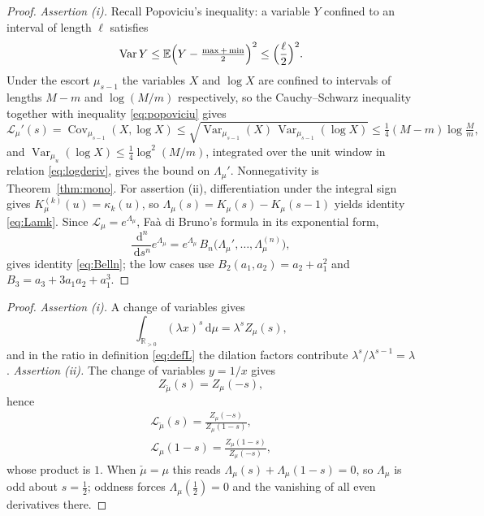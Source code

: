 \documentclass[sn-mathphys-num]{sn-jnl}
\theoremstyle{thmstyleone}%
\theoremstyle{thmstyletwo}%
\theoremstyle{thmstylethree}%
\theoremstyle{thmstyleone}%
\providecommand{\E}{\mathbb{E}}
\providecommand{\Var}{\operatorname{Var}}
\providecommand{\Cov}{\operatorname{Cov}}
\providecommand{\Rpos}{\mathbb{R}_{>0}}
\providecommand{\Leh}{\mathscr{L}}
\providecommand{\dd}{\,\mathrm{d}}
\begin{document}
\begin{appendices}
		\begin{proof}
			\emph{Assertion (i).} Recall Popoviciu's inequality: a variable $Y$
			confined to an interval of length $\ell$ satisfies
			\begin{equation}\label{eq:popoviciu}
				\Var Y\le\E\Bigl(Y-\tfrac{\max+\min}{2}\Bigr)^2
				\le\Bigl(\frac{\ell}{2}\Bigr)^{2}.
			\end{equation}
			Under the escort $\mu_{s-1}$ the variables $X$ and $\log X$ are
			confined to intervals of lengths $M-m$ and $\log(M/m)$
			respectively, so the Cauchy--Schwarz inequality together with
			inequality \eqref{eq:popoviciu} gives
			\begin{equation}\label{eq:grussproof}
				\Leh_\mu'(s)=\Cov_{\mu_{s-1}}(X,\log X)
				\le\sqrt{\Var_{\mu_{s-1}}(X)\,\Var_{\mu_{s-1}}(\log X)}
				\le\tfrac14(M-m)\log\tfrac Mm ,
			\end{equation}
			and $\Var_{\mu_u}(\log X)\le\tfrac14\log^2(M/m)$, integrated over
			the unit window in relation \eqref{eq:logderiv}, gives the bound on
			$\Lambda_\mu'$. Nonnegativity is Theorem~\ref{thm:mono}. For
			assertion (ii), differentiation under the integral sign gives
			$K_\mu^{(k)}(u)=\kappa_k(u)$, so
			$\Lambda_\mu(s)=K_\mu(s)-K_\mu(s-1)$ yields identity
			\eqref{eq:Lamk}. Since $\Leh_\mu=e^{\Lambda_\mu}$, Fa\`a di
			Bruno's formula in its exponential form,
			\begin{equation}\label{eq:faadibruno}
				\frac{\dd^n}{\dd s^n}e^{\Lambda_\mu}
				=e^{\Lambda_\mu}\,
				B_n\bigl(\Lambda_\mu',\dots,\Lambda_\mu^{(n)}\bigr),
			\end{equation}
			gives identity \eqref{eq:Belln}; the low cases use
			$B_2(a_1,a_2)=a_2+a_1^2$ and $B_3=a_3+3a_1a_2+a_1^3$.
		\end{proof}
		\prophomogrefl*
		
		\begin{proof}
			\emph{Assertion (i).} A change of variables gives
			\begin{equation}\label{eq:dilation}
				\int_{\Rpos}(\lambda x)^{s}\dd\mu=\lambda^{s}Z_\mu(s),
			\end{equation}
			and in the ratio in definition \eqref{eq:defL} the dilation factors contribute
			$\lambda^{s}/\lambda^{s-1}=\lambda$. \emph{Assertion (ii).} The
			change of variables $y=1/x$ gives
			\begin{equation}\label{eq:inversionZ}
				Z_{\check\mu}(s)=Z_\mu(-s),
			\end{equation}
			hence
			\begin{equation}\label{eq:inversionL}
				\begin{gathered}
					\Leh_{\check\mu}(s)=\frac{Z_\mu(-s)}{Z_\mu(1-s)},\\
					\Leh_\mu(1-s)=\frac{Z_\mu(1-s)}{Z_\mu(-s)},
				\end{gathered}
			\end{equation}
			whose product is $1$. When $\check\mu=\mu$ this reads
			$\Lambda_\mu(s)+\Lambda_\mu(1-s)=0$, so $\Lambda_\mu$ is odd about
			$s=\tfrac12$; oddness forces $\Lambda_\mu(\tfrac12)=0$ and the
			vanishing of all even derivatives there.
		\end{proof}
		

\end{appendices}
\end{document}

